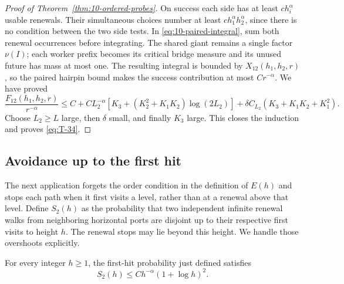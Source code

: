 \begin{proof}[Proof of Theorem~\ref{thm:10-ordered-probes}]
On success each side has at least \(ch_i^\alpha\) usable renewals.
Their simultaneous choices number at least
\(c h_1^\alpha h_2^\alpha\), since there is no condition between the
two side tests. In \eqref{eq:10-paired-integral}, sum both renewal
occurrences before integrating. The shared giant remains a single
factor \(\nu(I)\); each worker prefix becomes its critical bridge
measure and its unused future has mass at most one. The resulting
integral is bounded by \(X_{12}(h_1,h_2,r)\), so the paired hairpin
bound makes the success contribution at most \(Cr^{-\alpha}\).
We have proved
\[
 \frac{F_{12}(h_1,h_2,r)}{r^{-\alpha}}
 \le C+CL_2^{-\alpha}
       [K_3+(K_2^2+K_1K_2)\log(2L_2)]
       +\delta C_{L_2}(K_3+K_1K_2+K_1^2).
\]
Choose \(L_2\ge L\) large, then \(\delta\) small, and finally \(K_3\)
large. This closes the induction and proves \eqref{eq:T-34}.
\end{proof}

\subsection{Avoidance up to the first hit}

The next application forgets the order condition in the definition of
$E(h)$ and stops each path when it first visits a level, rather than
at a renewal above that level. Define $S_2(h)$ as the probability that
two independent infinite renewal walks from neighboring horizontal
ports are disjoint up to their respective first visits to height $h$.
The renewal stops may lie beyond this height. We handle those
overshoots explicitly.

\begin{corollary}
\label{cor:10-log-first-hit}
For every integer $h\ge1$, the first-hit probability just defined satisfies
\begin{equation}
 S_2(h)\le Ch^{-\alpha}(1+\log h)^2.\label{eq:T-35a}
\end{equation}
\end{corollary}

